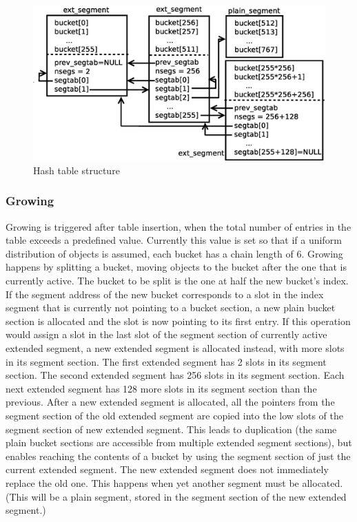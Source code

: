 \documentclass[aps,pre,preprint,nofootinbib]{revtex4}
\begin{document}
\begin{figure}[htb]
\centering
\includegraphics[width=1.0\textwidth]{hash_table_structure.eps}
\caption{Hash table structure} 
\label{fig:hash_table_structure}
\end{figure}

\subsubsection{Growing}

Growing is triggered after table insertion, when the total number of entries in the table exceeds a predefined value.
Currently this value is set so that if a uniform distribution of objects is assumed, each bucket has a chain length of 6.
Growing happens by splitting a bucket, moving objects to the bucket after the one that is currently active.
The bucket to be split is the one at half the new bucket's index.
If the segment address of the new bucket corresponds to a slot in the index segment that is currently not pointing to a bucket section, a new plain bucket section is allocated and the slot is now pointing to its first entry.
If this operation would assign a slot in the last slot of the segment section of currently active extended segment, a new extended segment is allocated instead, with more slots in its segment section.
The first extended segment has 2 slots in its segment section.
The second extended segment has 256 slots in its segment section.
Each next extended segment has 128 more slots in its segment section than the previous.
After a new extended segment is allocated, all the pointers from the segment section of the old extended segment are copied into the low slots of the segment section of new extended segment.
This leads to duplication (the same plain bucket sections are accessible from multiple extended segment sections), but enables reaching the contents of a bucket by using the segment section of just the current extended segment.
The new extended segment does not immediately replace the old one.
This happens when yet another segment must be allocated.
(This will be a plain segment, stored in the segment section of the new extended segment.)
\end{document}
